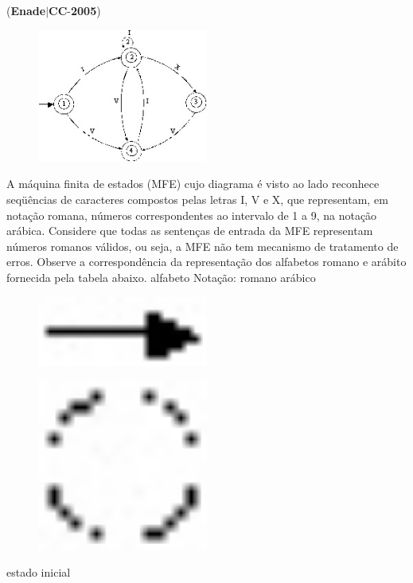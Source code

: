 \documentclass{exam}
\begin{document}
\begin{questions}
\begin{enumerate}[label=\alph*)]
	\end{enumerate}

\question (\textbf{Enade}$|$\textbf{CC}-\textbf{2005}) \begin{figure}[H]
	\begin{center}
		\includegraphics[width=0.5\textwidth]{CIENCIA_DA_COMPUTACAO_Prova2005-utf8_figuras/fig-0040.jpg}
	\end{center}
\end{figure}
A máquina finita de estados (MFE) cujo diagrama é visto ao lado
reconhece seqüências de caracteres compostos pelas letras I, V e X, que
representam, em notação romana, números correspondentes ao intervalo de
1 a 9, na notação arábica. Considere que todas as sentenças de entrada da
MFE representam números romanos válidos, ou seja, a MFE não tem
mecanismo de tratamento de erros. Observe a correspondência da
representação dos alfabetos romano e arábito fornecida pela tabela abaixo.
alfabeto Notação:
romano arábico 
  
\begin{figure}[H]
	\begin{center}
		\includegraphics[width=0.5\textwidth]{CIENCIA_DA_COMPUTACAO_Prova2005-utf8_figuras/fig-0035.jpg}
	\end{center}
\end{figure}
\begin{figure}[H]
	\begin{center}
		\includegraphics[width=0.5\textwidth]{CIENCIA_DA_COMPUTACAO_Prova2005-utf8_figuras/fig-0036.jpg}
	\end{center}
\end{figure}
estado inicial
 

\end{questions}
\end{document}
